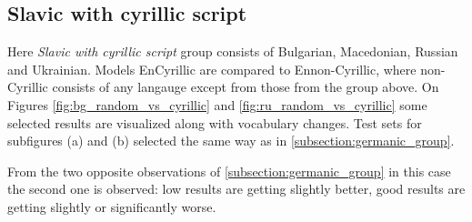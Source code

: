 \cleardoublepage
\subsection{Slavic with cyrillic script}
\label{subsection:cyrillic_group}

Here \textit{Slavic with cyrillic script} group consists of
Bulgarian, Macedonian, Russian and Ukrainian.
Models En\to{}Cyrillic are compared to En\to{}non-Cyrillic, where non-Cyrillic consists
of any langauge except from those from the group above.
On Figures \ref{fig:bg_random_vs_cyrillic} and \ref{fig:ru_random_vs_cyrillic} some selected
results are visualized along with vocabulary changes. Test sets for subfigures (a) and (b)
selected the same way as in \ref{subsection:germanic_group}.

From the two opposite observations of \ref{subsection:germanic_group} in this case
the second one is observed: low results are getting slightly better,
good results are getting slightly or significantly worse.

